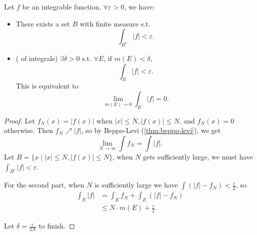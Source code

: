\begin{proposition}
    Let $f$ be an integrable function, $\forall\varepsilon>0$, we have:
	 \begin{itemize}
		\item There exists a set $B$ with finite measure s.t.
			\[
				\int_{B^c}|f|<\varepsilon
			.\]
	    \item ( of integrals) $\exists\delta>0$ s.t.
			$\forall E$, if $m(E)<\delta$,
			 \[
			 \int_E |f| < \varepsilon
			.\]
			This is equivalent to
			\[
				\lim_{m(E)\to 0}\int_E |f| = 0
			.\]
	\end{itemize}
\end{proposition}
\begin{proof}[Proof]
    Let $f_N(x) = |f(x)|$ when $|x|\le N, |f(x)|\le N$, and $f_N(x)=0$ otherwise. 
	Then $f_N \nearrow |f|$, so by Beppo-Levi (\autoref{thm:beppo-levi}),
	we get
	\[
		\lim_{N\to \infty}\int f_N = \int |f|.
	\]
	Let $B = \{x\mid |x|\le N, |f(x)|\le N\}$, when $N$ gets sufficiently large,
	we must have $\int_{B^c}|f|<\varepsilon$.

	For the second part, when $N$ is sufficiently large we have
	$\int (|f|-f_N)<\frac{\varepsilon}{2}$, so
	\begin{align*}
		\int_{E}|f| &= \int_E f_N + \int_E(|f|-f_N)\\
		&\le N\cdot m(E) + \frac{\varepsilon}{2}.
	\end{align*}
	
	Let $\delta = \frac{\varepsilon}{2N}$ to finish.
\end{proof}
